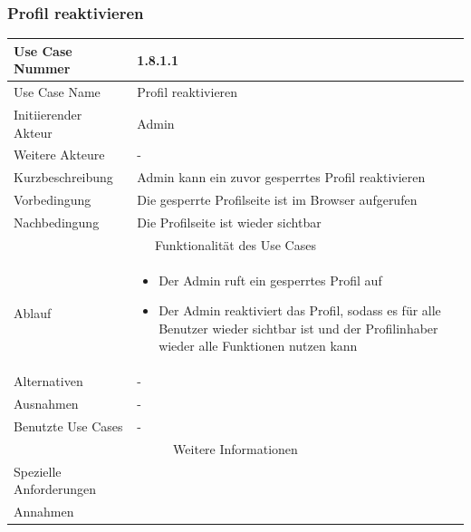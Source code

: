 \documentclass[10pt,a4paper]{article}
\begin{document}
			\subsubsection{Profil reaktivieren}
		\begin{tabularx}{\textwidth}{|l|X|}
		\hline Use Case Nummer & 1.8.1.1 \\ 
		\hline Use Case Name & Profil reaktivieren \\ 
		\hline Initiierender Akteur & Admin \\
		\hline Weitere Akteure & - \\
		\hline Kurzbeschreibung & Admin kann ein zuvor gesperrtes Profil reaktivieren \\
		\hline Vorbedingung & Die gesperrte Profilseite ist im Browser aufgerufen \\
		\hline Nachbedingung & Die Profilseite ist wieder sichtbar \\
		\hline \multicolumn{2}{|c|}{Funktionalität des Use Cases}\\
		\hline Ablauf & \begin{itemize}
					\item Der Admin ruft ein gesperrtes Profil auf
					\item Der Admin reaktiviert das Profil, sodass es f\"ur alle Benutzer wieder sichtbar ist und der Profilinhaber wieder alle Funktionen nutzen kann
				\end{itemize}\\
		\hline Alternativen & - \\
		\hline Ausnahmen & - \\
		\hline Benutzte Use Cases & - \\
		\hline \multicolumn{2}{|c|}{Weitere Informationen} \\
		\hline Spezielle Anforderungen &  \\
		\hline Annahmen &  \\
		\hline
		\end{tabularx}
		
\end{document}
